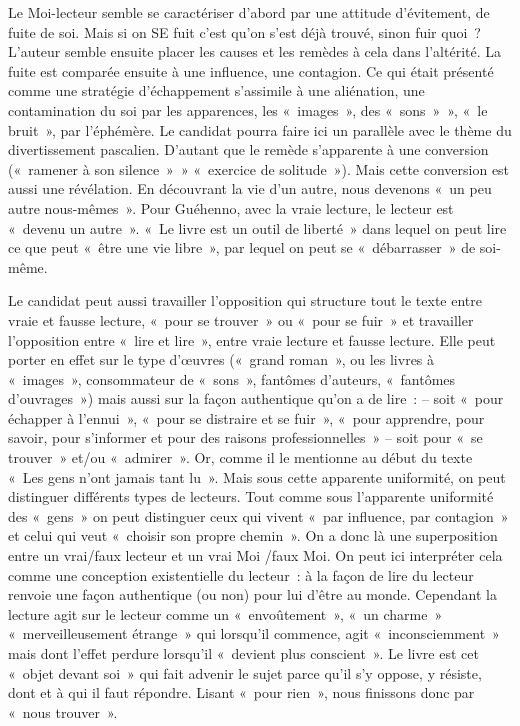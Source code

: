 {Le Moi-lecteur semble se caractériser d'abord par une attitude d'évitement, de fuite de
soi. Mais si on SE fuit c'est qu'on s'est déjà trouvé, sinon fuir quoi~? L'auteur semble ensuite
placer les causes et les remèdes à cela dans l'altérité. La fuite est comparée ensuite à une
influence, une contagion. Ce qui était présenté comme une stratégie d'échappement s'assimile à
une aliénation, une contamination du soi par les apparences, les «~images~», des «~sons~»~», «~le
bruit~», par l'éphémère. Le candidat pourra faire ici un parallèle avec le thème du divertissement
pascalien. D'autant que le remède s'apparente à une conversion («~ramener à son
silence~»~» «~exercice de solitude~»). Mais cette conversion est aussi une révélation. En
découvrant la vie d'un autre, nous devenons «~un peu autre nous-mêmes~». Pour Guéhenno,
avec la vraie lecture, le lecteur est «~devenu un autre~». «~Le livre est un outil de liberté~» dans
lequel on peut lire ce que peut «~être une vie libre~», par lequel on peut se «~débarrasser~» de
soi-même.

Le candidat peut aussi travailler l'opposition qui structure tout le texte entre vraie et fausse
lecture, «~pour se trouver~» ou «~pour se fuir~» et travailler l'opposition entre «~lire et lire~», entre
vraie lecture et fausse lecture. Elle peut porter en effet sur le type d'œuvres («~grand roman~», ou
les livres à «~images~», consommateur de «~sons~», fantômes d'auteurs, «~fantômes
d'ouvrages~») mais aussi sur la façon authentique qu'on a de lire~: -- soit «~pour échapper à
l'ennui~», «~pour se distraire et se fuir~», «~pour apprendre, pour savoir, pour s'informer et pour
des raisons professionnelles~» -- soit pour «~se trouver~» et/ou «~admirer~». Or, comme il le
mentionne au début du texte «~Les gens n'ont jamais tant lu~». Mais sous cette apparente
uniformité, on peut distinguer différents types de lecteurs. Tout comme sous l'apparente
uniformité des «~gens~» on peut distinguer ceux qui vivent «~par influence, par contagion~» et celui
qui veut «~choisir son propre chemin~». On a donc là une superposition entre un vrai/faux lecteur
et un vrai Moi /faux Moi. On peut ici interpréter cela comme une conception existentielle du
lecteur~: à la façon de lire du lecteur renvoie une façon authentique (ou non) pour lui d'être au
monde. Cependant la lecture agit sur le lecteur comme un «~envoûtement~», «~un charme~»
«~merveilleusement étrange~» qui lorsqu'il commence, agit «~inconsciemment~» mais dont l'effet
perdure lorsqu'il «~devient plus conscient~». Le livre est cet «~objet devant soi~» qui fait advenir le
sujet parce qu'il s'y oppose, y résiste, dont et à qui il faut répondre. Lisant «~pour rien~», nous
finissons donc par «~nous trouver~».}%
